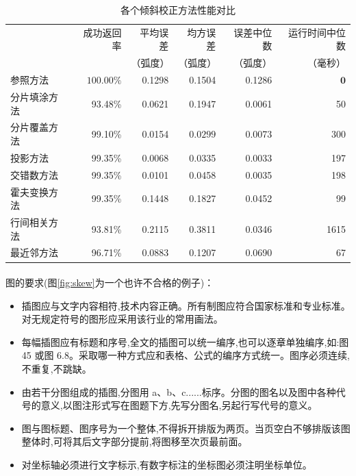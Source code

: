 ﻿\documentclass{sysuthesis}
\begin{document}
\begin{table}
\caption{各个倾斜校正方法性能对比}
\begin{tabular}{lrrrrr}
\hline
& 成功返回率 & 平均误差& 均方误差& 误差中位数& 运行时间中位数\\
& & （弧度） & （弧度） & （弧度） & （毫秒）\\\hline
参照方法&$\mathbf{100.00\%}$&0.1298&0.1504&0.1286&$\mathbf{0}$\\
分片填涂方法&93.48\%&0.0621&0.1947&0.0061&50\\
分片覆盖方法&99.10\%&0.0154&$\mathbf{0.0299}$&0.0073&300\\
投影方法&99.35\%&$\mathbf{0.0068}$&0.0335&$\mathbf{0.0033}$&197\\
交错数方法&99.35\%&0.0101&0.0458&0.0035&198\\
霍夫变换方法&99.35\%&0.1448&0.1827&0.0452&99\\
行间相关方法&93.81\%&0.2115&0.3811&0.0346&1615\\
最近邻方法&96.71\%&0.0883&0.1207&0.0690&67\\\hline
\end{tabular}
\label{tab:skew}
\end{table}

\paragraph{}图的要求(图\ref{fig:skew}为一个也许不合格的例子)：

\begin{itemize}
\item 插图应与文字内容相符,技术内容正确。所有制图应符合国家标准和专业标准。对无规定符号的图形应采用该行业的常用画法。
\item 每幅插图应有标题和序号,全文的插图可以统一编序,也可以逐章单独编序,如:图 45 或图 6.8。采取哪一种方式应和表格、公式的编序方式统一。图序必须连续,不重复,不跳缺。
\item 由若干分图组成的插图,分图用 a、b、c......标序。分图的图名以及图中各种代号的意义,以图注形式写在图题下方,先写分图名,另起行写代号的意义。
\item 图与图标题、图序号为一个整体,不得拆开排版为两页。当页空白不够排版该图整体时,可将其后文字部分提前,将图移至次页最前面。
\item 对坐标轴必须进行文字标示,有数字标注的坐标图必须注明坐标单位。
\end{itemize}
\end{document}
